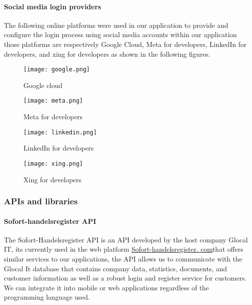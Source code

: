 \paragraph*{Social media login providers}
The following online platforms were used in our application to provide and configure the login process using social media accounts within our application those platforms are respectively Google Cloud, Meta for developers, LinkedIn for developers, and xing for developers as shown in the following figures.
\begin{figure}[H]%
    \center   
    \texttt{[image: google.png]}
    \caption{Google cloud}
\end{figure}
\begin{figure}[H]%
    \center   
    \texttt{[image: meta.png]}
    \caption{Meta for developers}
\end{figure}
\begin{figure}[H]%
    \center   
    \texttt{[image: linkedin.png]}
    \caption{LinkedIn for developers}
\end{figure}
\begin{figure}[H]%
    \center   
    \texttt{[image: xing.png]}
    \caption{Xing for developers}
\end{figure}
\subsubsection{APIs and libraries}
\paragraph*{Sofort-handelsregister API}
The Sofort-Handelsregister API is an API developed by the host company Glocal IT, its currently used in the web platform \href{https://sofort-handelsregister.com/}{Sofort-handelsregister. com}that offers similar services to our applications, the API allows us to communicate with the Glocal It database that contains company data, statistics, documents, and customer information as well as a robust login and register service for customers.\\
We can integrate it into mobile or web applications regardless of the programming language used.
